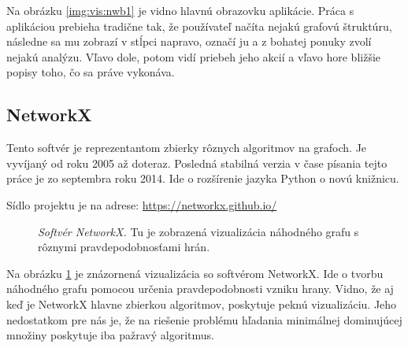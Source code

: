 Na obrázku \ref{img:vis:nwb1} je vidno hlavnú obrazovku aplikácie. Práca s 
aplikáciou prebieha tradične tak, že používateľ načíta nejakú grafovú štruktúru, 
následne sa mu zobrazí v stĺpci napravo, označí ju a z bohatej ponuky zvolí 
nejakú analýzu. Vľavo dole, potom vidí priebeh jeho akcií a vľavo hore bližšie 
popisy toho, čo sa práve vykonáva.


\subsection{NetworkX}

Tento softvér je reprezentantom zbierky rôznych algoritmov na grafoch. Je 
vyvíjaný od roku 2005 až doteraz. Posledná stabilná verzia v čase písania 
tejto práce je zo septembra roku 2014. Ide o rozšírenie jazyka Python o novú 
knižnicu.

Sídlo projektu je na adrese: \url{https://networkx.github.io/}

\begin{figure}
	\centering
	\caption{\emph{Softvér NetworkX.} Tu je zobrazená vizualizácia 
		náhodného grafu s rôznymi pravdepodobnosťami hrán.}
	\label{img:vis:nx}
\end{figure}

Na obrázku \ref{img:vis:nx} je znázornená vizualizácia so softvérom NetworkX. 
Ide o tvorbu náhodného grafu pomocou určenia pravdepodobnosti vzniku hrany. 
Vidno, že aj keď je NetworkX hlavne zbierkou algoritmov, poskytuje peknú 
vizualizáciu. Jeho nedostatkom pre nás je, že na riešenie problému hľadania 
minimálnej dominujúcej množiny poskytuje iba pažravý algoritmus.

